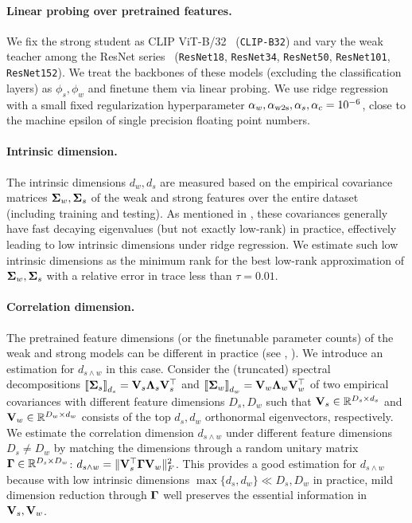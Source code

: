 \paragraph{Linear probing over pretrained features.}
We fix the strong student as CLIP ViT-B/32~\citep{radford2021learning} (\texttt{CLIP-B32}) and vary the weak teacher among the ResNet series~\citep{he2015deepresiduallearningimage} (\texttt{ResNet18}, \texttt{ResNet34}, \texttt{ResNet50}, \texttt{ResNet101}, \texttt{ResNet152}). We treat the backbones of these models (excluding the classification layers) as $\phi_s,\phi_w$ and finetune them via linear probing. We use ridge regression with a small fixed regularization hyperparameter $\alpha_w, \alpha_{\mathrm{w2s}}, \alpha_s, \alpha_c = 10^{-6}$, close to the machine epsilon of single precision floating point numbers.

\paragraph{Intrinsic dimension.}
The intrinsic dimensions $d_w, d_s$ are measured based on the empirical covariance matrices $\boldsymbol{\Sigma}_w, \boldsymbol{\Sigma}_s$ of the weak and strong features over the entire dataset (including training and testing).
As mentioned in , these covariances generally have fast decaying eigenvalues (but not exactly low-rank) in practice, effectively leading to low intrinsic dimensions under ridge regression. We estimate such low intrinsic dimensions as the minimum rank for the best low-rank approximation of $\boldsymbol{\Sigma}_w, \boldsymbol{\Sigma}_s$ with a relative error in trace less than $\tau=0.01$.

\paragraph{Correlation dimension.}
The pretrained feature dimensions (or the finetunable parameter counts) of the weak and strong models can be different in practice (see , ). 
We introduce an estimation for $d_{s \wedge w}$ in this case.
Consider the (truncated) spectral decompositions $\left\llbracket \boldsymbol{\Sigma}_s \right\rrbracket_{d_s} = \mathbf{V}_s \boldsymbol{\Lambda}_s \mathbf{V}_s^\top$ and $\left\llbracket \boldsymbol{\Sigma}_w \right\rrbracket_{d_w} = \mathbf{V}_w \boldsymbol{\Lambda}_w \mathbf{V}_w^\top$ of two empirical covariances with different feature dimensions $D_s, D_w$ such that $\mathbf{V}_s \in \mathbb{R}^{D_s \times d_s}$ and $\mathbf{V}_w \in \mathbb{R}^{D_w \times d_w}$ consists of the top $d_s, d_w$ orthonormal eigenvectors, respectively. We estimate the correlation dimension $d_{s \wedge w}$ under different feature dimensions $D_s \ne D_w$ by matching the dimensions through a random unitary matrix~\citep{vershynin2018high} $\boldsymbol{\Gamma} \in \mathbb{R}^{D_s \times D_w}$: $d_{s \wedge w} = \|\mathbf{V}_s^\top \boldsymbol{\Gamma} \mathbf{V}_w\|_F^2$. This provides a good estimation for $d_{s \wedge w}$ because with low intrinsic dimensions $\max\{d_s, d_w\} \ll D_s, D_w$ in practice, mild dimension reduction through $\boldsymbol{\Gamma}$ well preserves the essential information in $\mathbf{V}_s, \mathbf{V}_w$.

